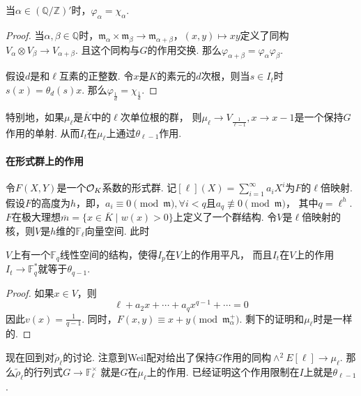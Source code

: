 \begin{cprop}
    当$\alpha\in (\mathbb{Q}/\mathbb{Z})'$时，$\varphi_{\alpha} = \chi_{\alpha}$.
\end{cprop}

\begin{proof}
    当$\alpha,\beta\in\mathbb{Q}$时，$\mathfrak{m}_{\alpha} \times \mathfrak{m}_{\beta} \to \mathfrak{m}_{\alpha + \beta}$，$(x, y)\mapsto xy$定义了同构$V_{\alpha} \otimes V_{\beta}\to V_{\alpha + \beta}$.
    且这个同构与$G$的作用交换.
    那么$\varphi_{\alpha+\beta} = \varphi_{\alpha}\varphi_{\beta}$.

    假设$d$是和$\ell$互素的正整数. 令$x$是$K$的素元的$d$次根，则当$s\in I_t$时$s(x) = \theta_d(s) x$.
    那么$\varphi_{\frac{1}{d}} = \chi_{\frac{1}{d}}$.
\end{proof}

特别地，如果$\mu_{\ell}$是$\overline{K}$中的$\ell$次单位根的群，
则$\mu_{\ell}\to V_{\frac{1}{\ell - 1}}, x\to x - 1$是一个保持$G$作用的单射.
从而$I_t$在$\mu_{\ell}$上通过$\theta_{\ell - 1}$作用.

\paragraph{在形式群上的作用}
令$F(X,Y)$是一个$\mathcal{O}_K$系数的形式群.
记$[\ell](X)=\sum_{i=1}^{\infty} a_i X^i$为$F$的$\ell$倍映射.
假设$F$的高度为$h$，即，$a_i\equiv 0\pmod{\mathfrak{m}},\forall i<q$且$a_q\not\equiv 0\pmod{\mathfrak{m}}$，
其中$q=\ell^h$.
$F$在极大理想$\overline{m} = \{x\in \overline{K}\mid w(x)>0\}$上定义了一个群结构.
令$V$是$\ell$倍映射的核，则$V$是$h$维的$\mathbb{F}_{\ell}$向量空间. 此时

\begin{cprop}
    $V$上有一个$\mathbb{F}_q$线性空间的结构，使得$I_p$在$V$上的作用平凡，
    而且$I_t$在$V$上的作用$I_t\to \mathbb{F}_q^{*}$就等于$\theta_{q-1}$.
\end{cprop}

\begin{proof}
    如果$x\in V$，则
    \begin{equation}
        \ell + a_2x + \cdots + a_{q}x^{q-1} + \cdots = 0
    \end{equation}
    因此$v(x) = \frac{1}{q-1}$.
    同时，$F(x,y)\equiv x + y \pmod{\mathfrak{m}_{\alpha}^{+}}$.
    剩下的证明和$\mu_{\ell}$时是一样的.
\end{proof}

现在回到对$\tilde{\rho}_{\ell}$的讨论.
注意到Weil配对给出了保持$G$作用的同构$\wedge^2 E[\ell] \to \mu_{\ell}$.
那么$\tilde{\rho}_{\ell}$的行列式$G\to \mathbb{F}_{\ell}^{\times}$
就是$G$在$\mu_{\ell}$上的作用.
已经证明这个作用限制在$I$上就是$\theta_{\ell-1}$.


